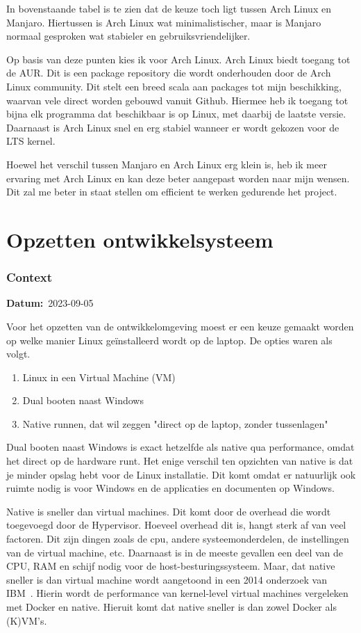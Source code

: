 \documentclass[a4paper]{report}
\newcommand{\personalbox}{
  \begin{tcolorbox}[hbox, colback=green!5!white,colframe=green!75!black,
    left=.1mm, right=.1mm, top=.1mm, bottom=.1mm, fontupper=\scriptsize\sffamily]
    Persoonlijke Keuze
  \end{tcolorbox}
}
\newcommand{\personalchoice}[1]{
  \section[ #1 ]{#1~\mbox{\raisebox{-2.5pt}{\personalbox}}}
}
\newcommand{\timestamp}[1]{
  \mbox{\scriptsize \textbf{Datum:} #1} \smallbreak
}
\begin{document}
In bovenstaande tabel is te zien dat de keuze toch ligt tussen Arch Linux en Manjaro.
Hiertussen is Arch Linux wat minimalistischer, maar is Manjaro normaal gesproken wat stabieler en gebruiksvriendelijker. 
\par\smallskip
Op basis van deze punten kies ik voor Arch Linux. 
Arch Linux biedt toegang tot de AUR. Dit is een package repository die wordt onderhouden door de Arch Linux community.
Dit stelt een breed scala aan packages tot mijn beschikking, waarvan vele direct worden gebouwd vanuit Github.
Hiermee heb ik toegang tot bijna elk programma dat beschikbaar is op Linux, met daarbij de laatste versie. 
Daarnaast is Arch Linux snel en erg stabiel wanneer er wordt gekozen voor de LTS kernel. 
\par\smallskip
Hoewel het verschil tussen Manjaro en Arch Linux erg klein is, heb ik meer ervaring met Arch Linux en kan deze beter aangepast worden naar mijn wensen. 
Dit zal me beter in staat stellen om efficient te werken gedurende het project.


\personalchoice{Opzetten ontwikkelsysteem}
\subsubsection{Context}
\timestamp{2023-09-05}
Voor het opzetten van de ontwikkelomgeving moest er een keuze gemaakt worden op welke manier Linux geïnstalleerd wordt op de laptop. 
De opties waren als volgt.
\begin{enumerate}
  \item Linux in een Virtual Machine (VM)
  \item Dual booten naast Windows
  \item Native runnen, dat wil zeggen "direct op de laptop, zonder tussenlagen"
\end{enumerate}

Dual booten naast Windows is exact hetzelfde als native qua performance, omdat het direct op de hardware runt. 
Het enige verschil ten opzichten van native is dat je minder opslag hebt voor de Linux installatie. Dit komt omdat er natuurlijk ook ruimte nodig is voor Windows en de applicaties en documenten op Windows. 
\par\smallskip
Native is sneller dan virtual machines. Dit komt door de overhead die wordt toegevoegd door de Hypervisor. 
Hoeveel overhead dit is, hangt sterk af van veel factoren. Dit zijn dingen zoals de cpu, andere systeemonderdelen, de instellingen van de virtual machine, etc. 
Daarnaast is in de meeste gevallen een deel van de CPU, RAM en schijf nodig voor de host-besturingssysteem.
Maar, dat native sneller is dan virtual machine wordt aangetoond in een 2014 onderzoek van IBM~\cite{felter2015updated}.
Hierin wordt de performance van kernel-level virtual machines vergeleken met Docker en native. 
Hieruit komt dat native sneller is dan zowel Docker als (K)VM's. 
\end{document}
